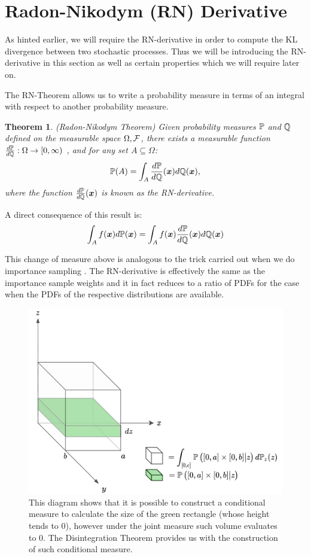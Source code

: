 \documentclass[a4paper,12pt,twoside,openright]{report}
\newtheorem{theorem}{Theorem}
\theoremstyle{definition}
\begin{document}
\section{Radon-Nikodym (RN) Derivative}

As hinted earlier, we will require the RN-derivative in order to compute the KL divergence between two stochastic processes. Thus we will be introducing the RN-derivative in this section as well as certain properties which we will require later on.

The RN-Theorem allows us to write a probability measure in terms of an integral with respect to another probability measure. 

\begin{theorem}
(Radon-Nikodym Theorem)
Given probability measures $\P$ and $\Q$ defined on the measurable space $\Omega, \calF$, there exists a measurable function $\frac{d\P}{d\Q}:\Omega \rightarrow [0, \infty)$ , and for any  set $A \subseteq  \Omega$:
\begin{align}
    \P(A) = \int_{A} \frac{d\P}{d\Q}(\vx) d\Q(\vx),
\end{align}
where the function $\frac{d\P}{d\Q}(\vx)$ is known as the RN-derivative.
\end{theorem}

A direct consequence of this result is:
\begin{align*}
    \int_A f(\vx) d\P(\vx) =  \int_{A} f(\vx)  \frac{d\P}{d\Q}(\vx)  d\Q(\vx)
\end{align*}

This change of measure above is analogous to the trick carried out when we do importance sampling \citep{martino2017effective}. The RN-derivative is effectively the same as the importance sample weights and it in fact reduces to a ratio of PDFs for the case when the PDFs of the respective distributions are available.
\begin{figure}[t!]
    \centering
    \includegraphics[scale=0.3]{images/disint2.png}
    \caption{ This diagram shows that it is possible to construct a conditional measure to calculate the size of the green rectangle (whose height tends to 0), however under the joint measure such volume evaluates to $0$. The Disintegration Theorem provides us with the construction of such conditional measure.}
    \label{fig:disintegration}
\end{figure}
\end{document}
